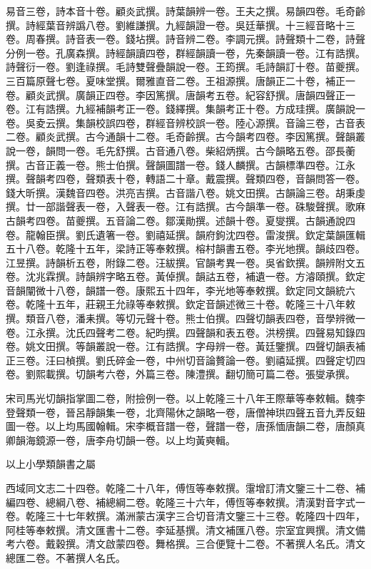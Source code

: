 \begin{pinyinscope}
易音三卷，詩本音十卷。顧炎武撰。詩葉韻辨一卷。王夫之撰。易韻四卷。毛奇齡撰。詩經葉音辨譌八卷。劉維謙撰。九經韻證一卷。吳廷華撰。十三經音略十三卷。周春撰。詩音表一卷。錢坫撰。詩音辨二卷。李調元撰。詩聲類十二卷，詩聲分例一卷。孔廣森撰。詩經韻讀四卷，群經韻讀一卷，先秦韻讀一卷。江有誥撰。詩聲衍一卷。劉逢祿撰。毛詩雙聲疊韻說一卷。王筠撰。毛詩韻訂十卷。苗夔撰。三百篇原聲七卷。夏味堂撰。爾雅直音二卷。王祖源撰。唐韻正二十卷，補正一卷。顧炎武撰。廣韻正四卷。李因篤撰。唐韻考五卷。紀容舒撰。唐韻四聲正一卷。江有誥撰。九經補韻考正一卷。錢繹撰。集韻考正十卷。方成珪撰。廣韻說一卷。吳夌云撰。集韻校誤四卷，群經音辨校誤一卷。陸心源撰。音論三卷，古音表二卷。顧炎武撰。古今通韻十二卷。毛奇齡撰。古今韻考四卷。李因篤撰。聲韻叢說一卷，韻問一卷。毛先舒撰。古音通八卷。柴紹炳撰。古今韻略五卷。邵長蘅撰。古音正義一卷。熊士伯撰。聲韻圖譜一卷。錢人麟撰。古韻標準四卷。江永撰。聲韻考四卷，聲類表十卷，轉語二十章。戴震撰。聲類四卷，音韻問答一卷。錢大昕撰。漢魏音四卷。洪亮吉撰。古音諧八卷。姚文田撰。古韻論三卷。胡秉虔撰。廿一部諧聲表一卷，入聲表一卷。江有誥撰。古今韻準一卷。硃駿聲撰。歌麻古韻考四卷。苗夔撰。五音論二卷。鄒漢勛撰。述韻十卷。夏燮撰。古韻通說四卷。龍翰臣撰。劉氏遺箸一卷。劉禧延撰。韻府鉤沈四卷。雷浚撰。欽定葉韻匯輯五十八卷。乾隆十五年，梁詩正等奉敕撰。榕村韻書五卷。李光地撰。韻歧四卷。江昱撰。詩韻析五卷，附錄二卷。汪紱撰。官韻考異一卷。吳省欽撰。韻辨附文五卷。沈兆霖撰。詩韻辨字略五卷。黃倬撰。韻詁五卷，補遺一卷。方濬頤撰。欽定音韻闡微十八卷，韻譜一卷。康熙五十四年，李光地等奉敕撰。欽定同文韻統六卷。乾隆十五年，莊親王允祿等奉敕撰。欽定音韻述微三十卷。乾隆三十八年敕撰。類音八卷，潘耒撰。等切元聲十卷。熊士伯撰。四聲切韻表四卷，音學辨微一卷。江永撰。沈氏四聲考二卷。紀昀撰。四聲韻和表五卷。洪榜撰。四聲易知錄四卷。姚文田撰。等韻叢說一卷。江有誥撰。字母辨一卷。黃廷鑒撰。四聲切韻表補正三卷。汪曰楨撰。劉氏碎金一卷，中州切音論贅論一卷。劉禧延撰。四聲定切四卷。劉熙載撰。切韻考六卷，外篇三卷。陳澧撰。翻切簡可篇二卷。張燮承撰。

宋司馬光切韻指掌圖二卷，附撿例一卷。以上乾隆三十八年王際華等奉敕輯。魏李登聲類一卷，晉呂靜韻集一卷，北齊陽休之韻略一卷，唐僧神珙四聲五音九弄反鈕圖一卷。以上均馬國翰輯。宋李概音譜一卷，聲譜一卷，唐孫愐唐韻二卷，唐顏真卿韻海鏡源一卷，唐李舟切韻一卷。以上均黃奭輯。

以上小學類韻書之屬

西域同文志二十四卷。乾隆二十八年，傅恆等奉敕撰。霮增訂清文鑒三十二卷、補編四卷、總綱八卷、補總綱二卷。乾隆三十六年，傅恆等奉敕撰。清漢對音字式一卷。乾隆三十七年敕撰。滿洲蒙古漢字三合切音清文鑒三十三卷。乾隆四十四年，阿桂等奉敕撰。清文匯書十二卷。李延基撰。清文補匯八卷。宗室宜興撰。清文備考六卷。戴穀撰。清文啟蒙四卷。舞格撰。三合便覽十二卷。不著撰人名氏。清文總匯二卷。不著撰人名氏。


\end{pinyinscope}
